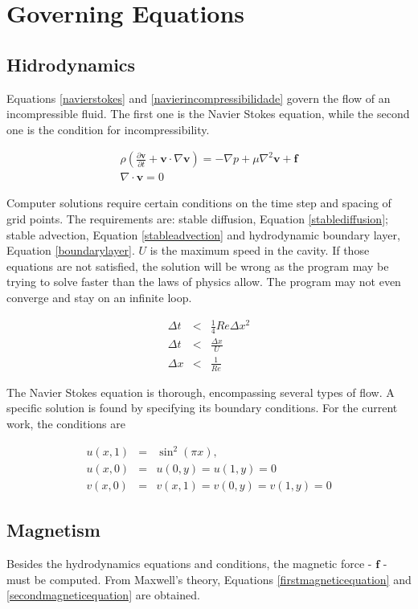 \documentclass[journal]{IEEEtran}
\begin{document}
\section{Governing Equations}
\subsection{Hidrodynamics}
Equations \ref{navierstokes} and \ref{navierincompressibilidade} govern the flow of an incompressible fluid. The first one is the Navier Stokes equation, while the second one is the condition for incompressibility.

\begin{eqnarray}
\rho\left( \frac{\partial {\textbf{v}}}{\partial t}+\textbf{v}\cdot\nabla \textbf{v} \right)=-\nabla p+\mu\nabla^2 \textbf{v} + \textbf{f}\label{navierstokes}\\
\nabla\cdot\textbf{v}=0\label{navierincompressibilidade}
\end{eqnarray}

Computer solutions require certain conditions on the time step and spacing of grid points. The requirements are: stable diffusion, Equation \ref{stablediffusion}; stable advection, Equation \ref{stableadvection} and hydrodynamic boundary layer, Equation \ref{boundarylayer}. $U$ is the maximum speed in the cavity. If those equations are not satisfied, the solution will be wrong as the program may be trying to solve faster than the laws of physics allow. The program may not even converge and stay on an infinite loop.

\begin{eqnarray}
\Delta t &<& \frac{1}{4}\mathit{Re}\Delta x^2 \label{stablediffusion}\\
\Delta t &<& \frac{\Delta x}{U} \label{stableadvection}\\
\Delta x &<& \frac{1}{\mathit{Re}} \label{boundarylayer}
\end{eqnarray}

The Navier Stokes equation is thorough, encompassing several types of flow. A specific solution is found by specifying its boundary conditions. For the current work, the conditions are

\begin{eqnarray}
u(x,1) & = & \sin^2(\pi x),\\
u(x,0) & = & u(0,y) = u(1,y) = 0\\
v(x,0) & = & v(x,1) = v(0, y) = v(1, y) = 0
\end{eqnarray}

\subsection{Magnetism}
Besides the hydrodynamics equations and conditions, the magnetic force - $\mathbf{f}$ - must be computed. From Maxwell's theory, Equations \ref{firstmagneticequation} and \ref{secondmagneticequation} are obtained. 
\end{document}
